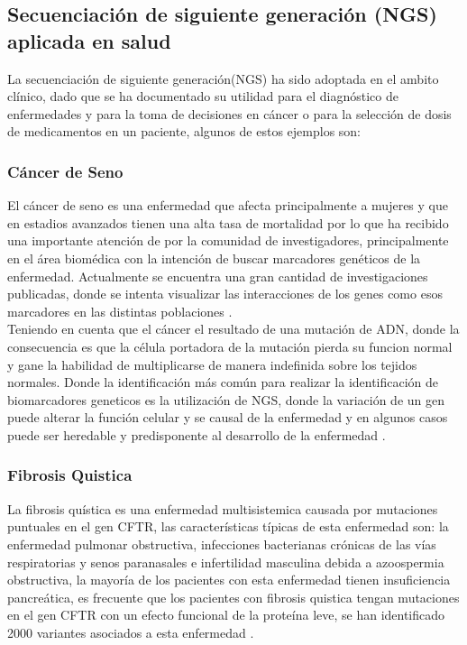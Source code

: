 \subsection{Secuenciación de siguiente generación (NGS) aplicada en salud}

La secuenciación de siguiente generación(NGS) ha sido adoptada en el ambito clínico, dado que se ha documentado su utilidad para el diagnóstico de enfermedades  y para la toma de decisiones en cáncer o para la selección de dosis de medicamentos en un paciente, \cite{Lubin2017} algunos de estos ejemplos son:

\subsubsection*{Cáncer de Seno}

El cáncer de seno es una enfermedad que afecta principalmente a mujeres y que en estadios avanzados tienen una alta tasa de mortalidad por lo que ha recibido una importante atención de por la comunidad de investigadores, principalmente en el área biomédica con la intención de buscar marcadores genéticos de la enfermedad. Actualmente se encuentra una gran cantidad de investigaciones publicadas, donde se intenta visualizar las interacciones de los genes como esos marcadores en las distintas poblaciones \cite{Jurca2016}.\\

Teniendo en cuenta que el cáncer el resultado de una mutación de ADN, donde la consecuencia es que la célula portadora de la mutación pierda su funcion normal y gane la habilidad de multiplicarse de manera indefinida sobre los tejidos normales. Donde la identificación más común para realizar la identificación de biomarcadores geneticos es la utilización de NGS, donde la variación de un gen puede alterar la función celular y se causal de la enfermedad y en algunos casos puede ser heredable y predisponente al desarrollo de la enfermedad \cite{Jurca2016,Wenger2017}.


\subsubsection*{Fibrosis Quistica}

La fibrosis quística es una enfermedad multisistemica causada por mutaciones puntuales en el gen CFTR, las características típicas de esta enfermedad son: la enfermedad pulmonar obstructiva, infecciones bacterianas crónicas de las vías respiratorias y senos paranasales e infertilidad masculina debida  a azoospermia obstructiva, la mayoría de los pacientes con esta enfermedad tienen insuficiencia pancreática, es frecuente que los pacientes con fibrosis quistica tengan mutaciones en el gen CFTR con un efecto funcional de la proteína leve, se han identificado 2000 variantes asociados a esta enfermedad \cite{Terlizzi2017}. 


